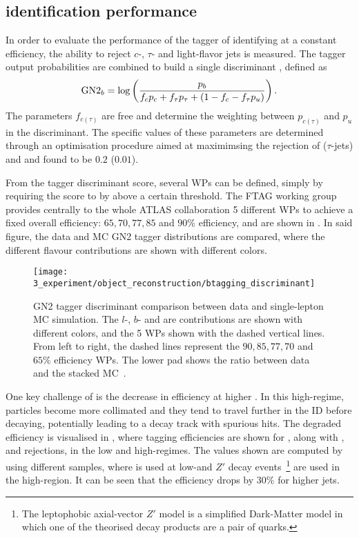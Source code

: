 \subsection{\bjet identification performance}

In order to evaluate the performance of the tagger of identifying \bjets at a constant efficiency, the ability to reject \(c\)-, \(\tau\)- and light-flavor jets is measured. The tagger output probabilities are combined to build a single discriminant \gntb, defined as
\begin{equation}
    \text{GN2}_{b} = \log \left(
        \frac{p_b}{f_c p_c + f_{\tau} p_{\tau} + \left(1-f_c-f_{\tau}p_u\right)}
    \right).
\end{equation}
The parameters \(f_{c(\tau)}\) are free and determine the weighting between \(p_{c(\tau)}\) and \(p_u\) in the discriminant. The specific values of these parameters are determined through an optimisation procedure aimed at maximimsing the rejection of \cjets (\(\tau\)-jets) and \ljets and found to be \(0.2\) (\(0.01\)).


From the tagger discriminant score, several \acp{WP} can be defined, simply by requiring the \gntb score to by above a certain threshold. The \ac{FTAG} working group provides centrally to the whole \ac{ATLAS} collaboration 5 different \acp{WP} to achieve a fixed overall \btagging efficiency: \(65, 70, 77, 85\) and \(90\%\) efficiency, and are shown in \Fig{\ref{fig:objects:jet_tagging:btag_discrminant}}. In said figure, the data and \ac{MC} GN2 tagger distributions are compared, where the different flavour contributions are shown with different colors.

\begin{figure}[ht!]
    \centering
    \texttt{[image: 3\_experiment/object\_reconstruction/btagging\_discriminant]}
    \caption{GN2 tagger discriminant comparison between data and single-lepton \ttbar \ac{MC} simulation. The \(l\)-, \(b\)- and \cjets are contributions are shown with different colors, and the 5 \btag \acp{WP} shown with the dashed vertical lines. From left to right, the dashed lines represent the \(90, 85, 77, 70\) and \(65\%\) efficiency \acp{WP}. The lower pad shows the ratio between data and the stacked \ac{MC}~\cite{ATLAS-FTAG-GN2BtagWPs}.}
    \label{fig:objects:jet_tagging:btag_discrminant}
\end{figure}

One key challenge of \btagging is the decrease in efficiency at higher \pt. In this high-\pt regime, particles become more collimated and they tend to travel further in the \ac{ID} before decaying, potentially leading to a decay track with spurious hits. The degraded efficiency is visualised in \Tab{\ref{tab:objects:ftag:btag_efficiency_original}}, where tagging efficiencies are shown for \bjets, along with \cjets, \ljets and \tjets rejections, in the low and high-\pt regimes. The values shown are computed by using different samples, where \ttbar is used at low-\pt and \(Z'\) decay events~\footnote{The leptophobic axial-vector \(Z'\) model is a simplified Dark-Matter model in which one of the theorised decay products are a pair of quarks.} are used in the high-\pt region. It can be seen that the \btag efficiency drops by \(30\%\) for higher \pt jets.

